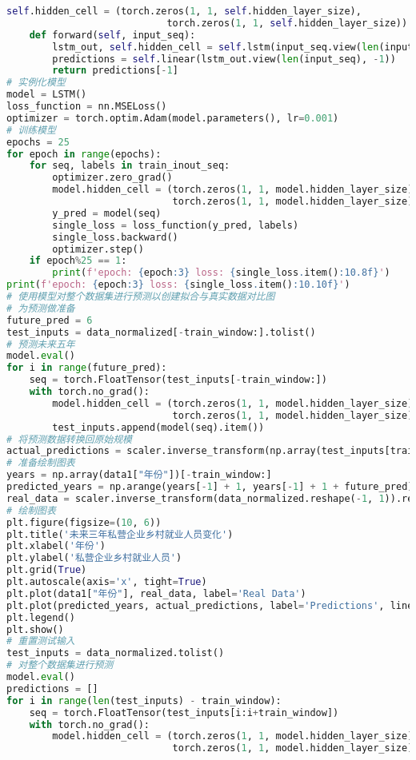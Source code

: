 \begin{lstlisting}[language=python,caption={就业前景}]
        self.hidden_cell = (torch.zeros(1, 1, self.hidden_layer_size),
                            torch.zeros(1, 1, self.hidden_layer_size))
    def forward(self, input_seq):
        lstm_out, self.hidden_cell = self.lstm(input_seq.view(len(input_seq), 1, -1), self.hidden_cell)
        predictions = self.linear(lstm_out.view(len(input_seq), -1))
        return predictions[-1]
# 实例化模型
model = LSTM()
loss_function = nn.MSELoss()
optimizer = torch.optim.Adam(model.parameters(), lr=0.001)
# 训练模型
epochs = 25
for epoch in range(epochs):
    for seq, labels in train_inout_seq:
        optimizer.zero_grad()
        model.hidden_cell = (torch.zeros(1, 1, model.hidden_layer_size),
                             torch.zeros(1, 1, model.hidden_layer_size))
        y_pred = model(seq)
        single_loss = loss_function(y_pred, labels)
        single_loss.backward()
        optimizer.step()
    if epoch%25 == 1:
        print(f'epoch: {epoch:3} loss: {single_loss.item():10.8f}')
print(f'epoch: {epoch:3} loss: {single_loss.item():10.10f}')
# 使用模型对整个数据集进行预测以创建拟合与真实数据对比图
# 为预测做准备
future_pred = 6
test_inputs = data_normalized[-train_window:].tolist()
# 预测未来五年
model.eval()
for i in range(future_pred):
    seq = torch.FloatTensor(test_inputs[-train_window:])
    with torch.no_grad():
        model.hidden_cell = (torch.zeros(1, 1, model.hidden_layer_size),
                             torch.zeros(1, 1, model.hidden_layer_size))
        test_inputs.append(model(seq).item())
# 将预测数据转换回原始规模
actual_predictions = scaler.inverse_transform(np.array(test_inputs[train_window:] ).reshape(-1, 1))
# 准备绘制图表
years = np.array(data1["年份"])[-train_window:]
predicted_years = np.arange(years[-1] + 1, years[-1] + 1 + future_pred)
real_data = scaler.inverse_transform(data_normalized.reshape(-1, 1)).reshape(-1)
# 绘制图表
plt.figure(figsize=(10, 6))
plt.title('未来三年私营企业乡村就业人员变化')
plt.xlabel('年份')
plt.ylabel('私营企业乡村就业人员')
plt.grid(True)
plt.autoscale(axis='x', tight=True)
plt.plot(data1["年份"], real_data, label='Real Data')
plt.plot(predicted_years, actual_predictions, label='Predictions', linestyle='--')
plt.legend()
plt.show()
# 重置测试输入
test_inputs = data_normalized.tolist()
# 对整个数据集进行预测
model.eval()
predictions = []
for i in range(len(test_inputs) - train_window):
    seq = torch.FloatTensor(test_inputs[i:i+train_window])
    with torch.no_grad():
        model.hidden_cell = (torch.zeros(1, 1, model.hidden_layer_size),
                             torch.zeros(1, 1, model.hidden_layer_size))

\end{lstlisting}
